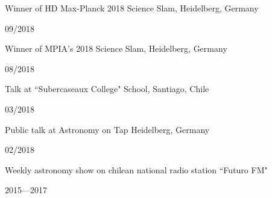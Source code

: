 \documentclass[12pt, a4paper]{article} %
\begin{document}
\begin{minipage}[t]{0.7\textwidth}
\begin{flushleft}%
  \setlength{\leftskip}{0.2cm}%
Winner of HD Max-Planck 2018 Science Slam, Heidelberg, Germany 
\end{flushleft}
\end{minipage}
\begin{minipage}[t]{0.3\textwidth}
\hfill 09/2018
\end{minipage}

\begin{minipage}[t]{0.7\textwidth}
\begin{flushleft}%
  \setlength{\leftskip}{0.2cm}%
Winner of MPIA's 2018 Science Slam, Heidelberg, Germany 
\end{flushleft}
\end{minipage}
\begin{minipage}[t]{0.3\textwidth}
\hfill 08/2018
\end{minipage}

\begin{minipage}[t]{0.7\textwidth}
\begin{flushleft}%
  \setlength{\leftskip}{0.2cm}%
Talk at ``Subercaseaux College" School, Santiago, Chile
\end{flushleft}
\end{minipage}
\begin{minipage}[t]{0.3\textwidth}
\hfill 03/2018
\end{minipage}

\begin{minipage}[t]{0.7\textwidth}
\begin{flushleft}%
  \setlength{\leftskip}{0.2cm}%
Public talk at Astronomy on Tap Heidelberg, Germany 
\end{flushleft}
\end{minipage}
\begin{minipage}[t]{0.3\textwidth}
\hfill 02/2018
\end{minipage}

\begin{minipage}[t]{0.7\textwidth}
\begin{flushleft}%
  \setlength{\leftskip}{0.2cm}%
Weekly astronomy show on chilean national radio station ``Futuro FM"
\end{flushleft}
\end{minipage}
\begin{minipage}[t]{0.3\textwidth}
\hfill 2015---2017
\end{minipage}
\end{document}
